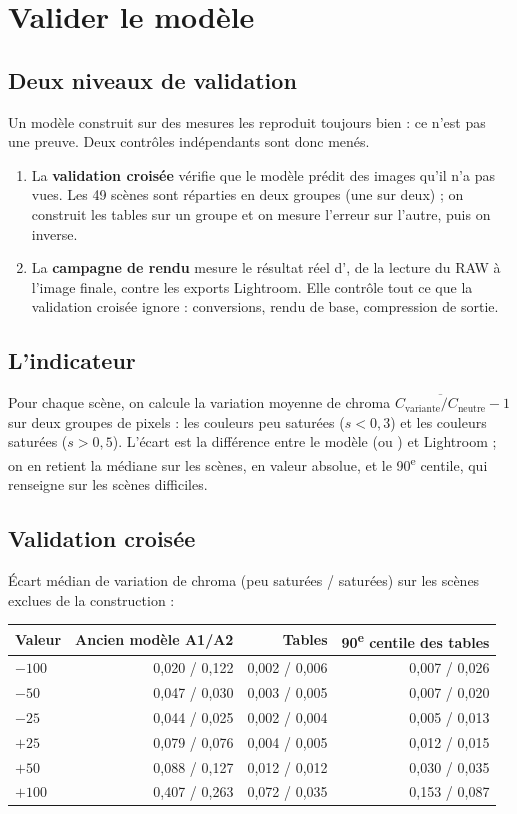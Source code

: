 \chapter{Valider le modèle}

\section{Deux niveaux de validation}
Un modèle construit sur des mesures les reproduit toujours bien : ce n'est pas
une preuve. Deux contrôles indépendants sont donc menés.
\begin{enumerate}
\item La \textbf{validation croisée} vérifie que le modèle prédit des images
qu'il n'a pas vues. Les 49 scènes sont réparties en deux groupes (une sur
deux) ; on construit les tables sur un groupe et on mesure l'erreur sur
l'autre, puis on inverse.
\item La \textbf{campagne de rendu} mesure le résultat réel d'\IPR{}, de la
lecture du RAW à l'image finale, contre les exports Lightroom. Elle contrôle
tout ce que la validation croisée ignore : conversions, rendu de base,
compression de sortie.
\end{enumerate}

\section{L'indicateur}
Pour chaque scène, on calcule la variation moyenne de chroma
$\overline{C_{\text{variante}}/C_{\text{neutre}}}-1$ sur deux groupes de pixels :
les couleurs peu saturées ($s<0{,}3$) et les couleurs saturées ($s>0{,}5$).
L'écart est la différence entre le modèle (ou \IPR{}) et Lightroom ; on en
retient la médiane sur les scènes, en valeur absolue, et le 90\textsuperscript{e}
centile, qui renseigne sur les scènes difficiles.

\section{Validation croisée}
Écart médian de variation de chroma (peu saturées / saturées) sur les scènes
exclues de la construction :

\begin{center}
\begin{tabular}{lrrr}
\toprule
Valeur & Ancien modèle A1/A2 & Tables & 90\textsuperscript{e} centile des tables\\
\midrule
$-100$ & 0,020 / 0,122 & 0,002 / 0,006 & 0,007 / 0,026\\
$-50$ & 0,047 / 0,030 & 0,003 / 0,005 & 0,007 / 0,020\\
$-25$ & 0,044 / 0,025 & 0,002 / 0,004 & 0,005 / 0,013\\
$+25$ & 0,079 / 0,076 & 0,004 / 0,005 & 0,012 / 0,015\\
$+50$ & 0,088 / 0,127 & 0,012 / 0,012 & 0,030 / 0,035\\
$+100$ & 0,407 / 0,263 & 0,072 / 0,035 & 0,153 / 0,087\\
\bottomrule
\end{tabular}
\end{center}

